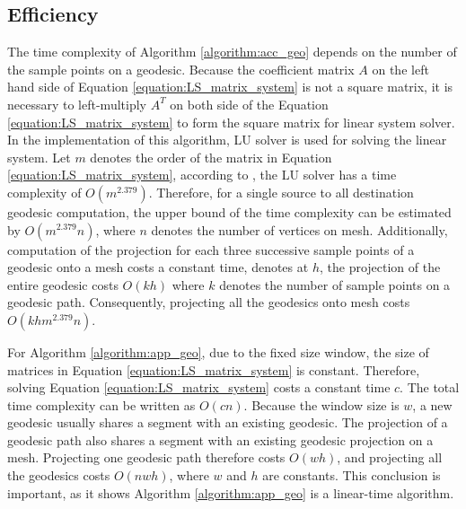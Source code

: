 \subsection{Efficiency}
The time complexity of Algorithm \ref{algorithm:acc_geo} depends on the number of the sample points on a geodesic. Because the coefficient matrix $A$ on the left hand side of Equation \ref{equation:LS_matrix_system} is not a square matrix, it is necessary to left-multiply $A^{T}$ on both side of the Equation \ref{equation:LS_matrix_system} to form the square matrix for linear system solver. In the implementation of this algorithm, LU solver is used for solving the linear system. Let $m$ denotes the order of the matrix in Equation \ref{equation:LS_matrix_system}, according to , the LU solver has a time complexity of $O(m^{2.379})$. Therefore, for a single source to all destination geodesic computation, the upper bound of the time complexity can be estimated by $O(m^{2.379}n)$, where $n$ denotes the number of vertices on mesh.  Additionally, computation of the projection for each three successive sample points of a geodesic onto a mesh costs a constant time, denotes at $h$, the projection of the entire geodesic costs $O(kh)$ where $k$ denotes the number of sample points on a geodesic path. Consequently, projecting all the geodesics onto mesh costs $O(khm^{2.379}n)$.

For Algorithm \ref{algorithm:app_geo}, due to the fixed size window, the size of matrices in Equation \ref{equation:LS_matrix_system} is constant. Therefore, solving Equation \ref{equation:LS_matrix_system} costs a constant time $c$. The total time complexity can be written as $O(cn)$. Because the window size is $w$, a new geodesic usually shares a segment with an existing geodesic. The projection of a geodesic path also shares a segment with an existing geodesic projection on a mesh. Projecting one geodesic path therefore costs $O(wh)$, and projecting all the geodesics costs $O(nwh)$, where $w$ and $h$ are constants. This conclusion is important, as it shows Algorithm \ref{algorithm:app_geo} is a linear-time algorithm. 


